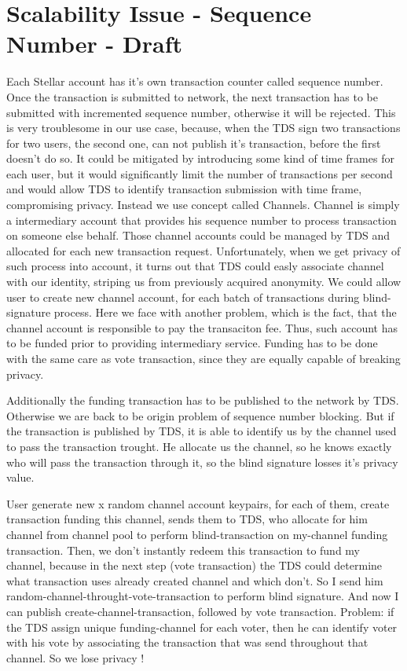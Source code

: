\documentclass[runningheads]{llncs}
\begin{document}
\section{Scalability Issue - Sequence Number - Draft}
Each Stellar account has it's own transaction counter called sequence number. Once the transaction is submitted to network, the next transaction has to be submitted with incremented sequence number, otherwise it will be rejected. This is very troublesome in our use case, because, when the TDS sign two transactions for two users, the second one, can not publish it's transaction, before the first doesn't do so. It could be mitigated by introducing some kind of time frames for each user, but it would significantly limit the number of transactions per second and would allow TDS to identify transaction submission with time frame, compromising privacy.
Instead we use concept called Channels. Channel is simply a intermediary account that provides his sequence number to process transaction on someone else behalf. Those channel accounts could be managed by TDS and allocated for each new transaction request. Unfortunately, when we get privacy of such process into account, it turns out that TDS could easly associate channel with our identity, striping us from previously acquired anonymity. 
We could allow user to create new channel account, for each batch of transactions during blind-signature process. Here we face with another problem, which is the fact, that the channel account is responsible to pay the transaciton fee. Thus, such account has to be funded prior to providing intermediary service. Funding has to be done with the same care as vote transaction, since they are equally capable of breaking privacy. 

Additionally the funding transaction has to be published to the network by TDS. Otherwise we are back to be origin problem of sequence number blocking. But if the transaction is published by TDS, it is able to identify us by the channel used to pass the transaction trought. He allocate us the channel, so he knows exactly who will pass the transaction through it, so the blind signature losses it's privacy value.

User generate new x random channel account keypairs, for each of them, create transaction funding this channel, sends them to TDS, who allocate for him channel from channel pool to perform blind-transaction on my-channel funding transaction. Then, we don't instantly redeem this transaction to fund my channel, because in the next step (vote transaction) the TDS could determine what transaction uses already created channel and which don't. So I send him random-channel-throught-vote-transaction to perform blind signature. And now I can publish create-channel-transaction, followed by vote transaction. 
Problem: if the TDS assign unique funding-channel for each voter, then he can identify voter with his vote by associating the transaction that was send throughout that channel. So we lose privacy !
\end{document}
